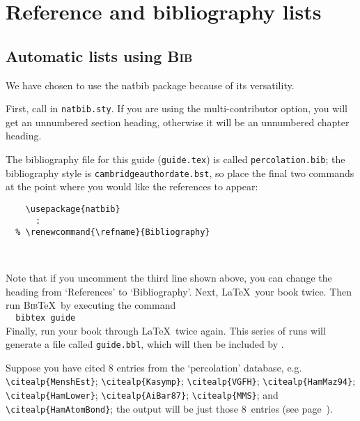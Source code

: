 
\chapter{Reference and bibliography lists}

\section{Automatic lists using \textsc{Bib}\upshape{\TeX}}

We have chosen to use the natbib package because of its versatility.

First, call in \texttt{natbib.sty}. If you are using the multi-contributor option, you will get an unnumbered section heading, otherwise it will be an unnumbered chapter heading.

The bibliography file for this guide (\texttt{\cambridge guide.tex}) is called \texttt{percolation.bib}; the bibliography style is \texttt{cambridgeauthordate.bst}, so place the final two commands at the point where you would like the references to appear:
%
\begin{verbatim}
    \usepackage{natbib}
      :
  % \renewcommand{\refname}{Bibliography}
    
    
\end{verbatim}
%
Note that if you uncomment the third line shown above, you can change the heading from `References' to `Bibliography'. Next, \LaTeX\ your book twice. Then run \textsc{Bib}\TeX\ by executing the command\\[0.5\baselineskip]
\verb"  bibtex "\texttt{\cambridge guide}\\[0.5\baselineskip]
Finally, run your book through \LaTeX\ twice again. This series of runs will generate a file called \texttt{\cambridge guide.bbl}, which will then be included by \verb"".

Suppose you have cited 8 entries from the `percolation' database, e.g. \verb"\citealp{MenshEst}"; \verb"\citealp{Kasymp}"; \verb"\citealp{VGFH}"; \verb"\citealp{HamMaz94}"; \verb"\citealp{HamLower}"; \verb"\citealp{AiBar87}"; \verb"\citealp{MMS}"; and \verb"\citealp{HamAtomBond}"; the output will be just those 8~entries (see page~\pageref{refs}).%
\nocite{MenshEst}\nocite{Kasymp}\nocite{VGFH}\nocite{HamMaz94}\nocite{HamLower}\nocite{AiBar87}\nocite{MMS}\nocite{HamAtomBond}

